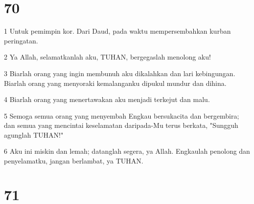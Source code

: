 \chapter{70}

\par 1 Untuk pemimpin kor. Dari Daud, pada waktu mempersembahkan kurban peringatan.
\par 2 Ya Allah, selamatkanlah aku, TUHAN, bergegaslah menolong aku!
\par 3 Biarlah orang yang ingin membunuh aku dikalahkan dan lari kebingungan. Biarlah orang yang menyoraki kemalanganku dipukul mundur dan dihina.
\par 4 Biarlah orang yang menertawakan aku menjadi terkejut dan malu.
\par 5 Semoga semua orang yang menyembah Engkau bersukacita dan bergembira; dan semua yang mencintai keselamatan daripada-Mu terus berkata, "Sungguh agunglah TUHAN!"
\par 6 Aku ini miskin dan lemah; datanglah segera, ya Allah. Engkaulah penolong dan penyelamatku, jangan berlambat, ya TUHAN.

\chapter{71}

